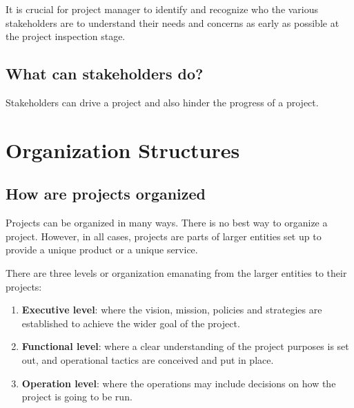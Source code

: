 \documentclass[math,code]{amznotes}
\theoremstyle{remark}
\begin{document}
It is crucial for project manager to identify and recognize who the various stakeholders are to understand their needs and concerns as early as possible at the project inspection stage.

\subsection{What can stakeholders do?}
Stakeholders can drive a project and also hinder the progress of a project.

\section{Organization Structures}
\subsection{How are projects organized}
Projects can be organized in many ways. There is no best way to organize a project. However, in all cases, projects are parts of larger entities set up to provide a unique product or a unique service.

There are three levels or organization emanating from the larger entities to their projects:
\begin{enumerate}
    \item \textbf{Executive level}: where the vision, mission, policies and strategies are established to achieve the wider goal of the project.
    \item \textbf{Functional level}: where a clear understanding of the project purposes is set out, and operational tactics are conceived and put in place.
    \item \textbf{Operation level}: where the operations may include decisions on how the project is going to be run.
\end{enumerate}
\end{document}
